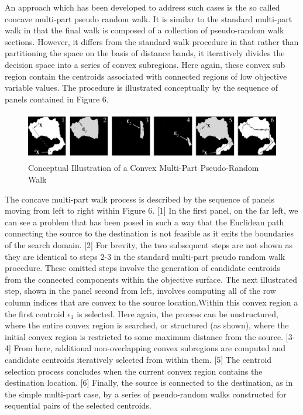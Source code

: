 An approach which has been developed to address such cases is the so called concave multi-part pseudo random walk. It is similar to the standard multi-part walk in that the final walk is composed of a collection of pseudo-random walk sections. However, it differs from the standard walk procedure in that rather than partitioning the space on the basis of distance bands, it iteratively divides the decision space into a series of convex subregions. Here again, these convex sub region contain the centroids associated with connected regions of low objective variable values. The procedure is illustrated conceptually by the sequence of panels contained in Figure 6.
            
            \begin{figure}[!h]
            \centering
            \includegraphics[width=5.5in]{figures/convex-multi-part-pseudo-random-walk-example.png}
            \caption[Conceptual Illustration of a Convex Multi-Part Pseudo-Random Walk]{Conceptual Illustration of a Convex Multi-Part Pseudo-Random Walk}
            \label{fig:convex-multi-part-pseudo-random-walk-example}
            \end{figure}
            
The concave multi-part walk process is described by the sequence of panels moving from left to right within Figure 6. [1] In the first panel, on the far left, we can see a problem that has been posed in such a way that the Euclidean path connecting the source to the destination is not feasible as it exits the boundaries of the search domain. [2]  For brevity, the two subsequent steps are not shown as they are identical to steps 2-3 in the standard multi-part pseudo random walk procedure. These omitted steps involve the generation of candidate centroids from the connected components within the objective surface. The next illustrated step, shown in the panel second from left, involves computing all of the row column indices that are convex to the source location.Within this convex region a the first centroid $\epsilon_1$ is selected. Here again, the process can be unstructured, where the entire convex region is searched, or structured  (as shown), where the initial convex region is restricted to some maximum distance from the source. [3-4] From here, additional non-overlapping convex subregions are computed and candidate centroids iteratively selected from within them. [5] The centroid selection process concludes when the current convex region contains the destination location. [6] Finally, the source is connected to the destination, as in the simple multi-part case, by a series of pseudo-random walks constructed for sequential pairs of the selected centroids.

